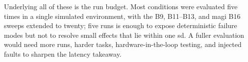 Underlying all of these is the run budget. Most conditions were evaluated five times in a single simulated environment, with the B9, B11–B13, and \gls{magi} B16 sweeps extended to twenty; five runs is enough to expose deterministic failure modes but not to resolve small effects that lie within one \gls{sd}. A fuller evaluation would need more runs, harder tasks, hardware-in-the-loop testing, and injected faults to sharpen the latency takeaway.

